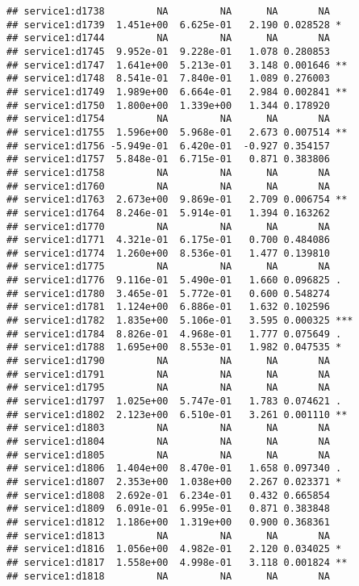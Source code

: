 \documentclass[
]{article}
\begin{document}
\begin{verbatim}
## service1:d1738         NA         NA      NA       NA    
## service1:d1739  1.451e+00  6.625e-01   2.190 0.028528 *  
## service1:d1744         NA         NA      NA       NA    
## service1:d1745  9.952e-01  9.228e-01   1.078 0.280853    
## service1:d1747  1.641e+00  5.213e-01   3.148 0.001646 ** 
## service1:d1748  8.541e-01  7.840e-01   1.089 0.276003    
## service1:d1749  1.989e+00  6.664e-01   2.984 0.002841 ** 
## service1:d1750  1.800e+00  1.339e+00   1.344 0.178920    
## service1:d1754         NA         NA      NA       NA    
## service1:d1755  1.596e+00  5.968e-01   2.673 0.007514 ** 
## service1:d1756 -5.949e-01  6.420e-01  -0.927 0.354157    
## service1:d1757  5.848e-01  6.715e-01   0.871 0.383806    
## service1:d1758         NA         NA      NA       NA    
## service1:d1760         NA         NA      NA       NA    
## service1:d1763  2.673e+00  9.869e-01   2.709 0.006754 ** 
## service1:d1764  8.246e-01  5.914e-01   1.394 0.163262    
## service1:d1770         NA         NA      NA       NA    
## service1:d1771  4.321e-01  6.175e-01   0.700 0.484086    
## service1:d1774  1.260e+00  8.536e-01   1.477 0.139810    
## service1:d1775         NA         NA      NA       NA    
## service1:d1776  9.116e-01  5.490e-01   1.660 0.096825 .  
## service1:d1780  3.465e-01  5.772e-01   0.600 0.548274    
## service1:d1781  1.124e+00  6.886e-01   1.632 0.102596    
## service1:d1782  1.835e+00  5.106e-01   3.595 0.000325 ***
## service1:d1784  8.826e-01  4.968e-01   1.777 0.075649 .  
## service1:d1788  1.695e+00  8.553e-01   1.982 0.047535 *  
## service1:d1790         NA         NA      NA       NA    
## service1:d1791         NA         NA      NA       NA    
## service1:d1795         NA         NA      NA       NA    
## service1:d1797  1.025e+00  5.747e-01   1.783 0.074621 .  
## service1:d1802  2.123e+00  6.510e-01   3.261 0.001110 ** 
## service1:d1803         NA         NA      NA       NA    
## service1:d1804         NA         NA      NA       NA    
## service1:d1805         NA         NA      NA       NA    
## service1:d1806  1.404e+00  8.470e-01   1.658 0.097340 .  
## service1:d1807  2.353e+00  1.038e+00   2.267 0.023371 *  
## service1:d1808  2.692e-01  6.234e-01   0.432 0.665854    
## service1:d1809  6.091e-01  6.995e-01   0.871 0.383848    
## service1:d1812  1.186e+00  1.319e+00   0.900 0.368361    
## service1:d1813         NA         NA      NA       NA    
## service1:d1816  1.056e+00  4.982e-01   2.120 0.034025 *  
## service1:d1817  1.558e+00  4.998e-01   3.118 0.001824 ** 
## service1:d1818         NA         NA      NA       NA    

\end{verbatim}
\end{document}

